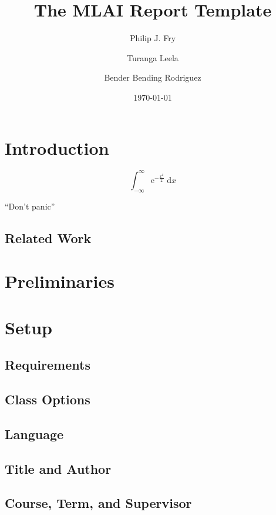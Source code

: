 \documentclass[logo]{mlai-report}
\title{The MLAI Report Template}
\author{Philip J. Fry \and Turanga Leela \and Bender Bending Rodriguez}
\date{\today}
\begin{document}
	\maketitle
	
	\begin{abstract}
		\blindtext 
	\end{abstract}
	

	\section{Introduction}
	
	\begin{equation}
	\int_{-\infty}^\infty \mathrm{e}^{-\frac{x^2}{2}} \; \mathrm{d}x 
	\end{equation}
	
	\enquote{Don't panic} \parencite{adams1979} \blindtext
	
	\subsection{Related Work}
	
	\section{Preliminaries} 

	\section{Setup} 
	
	\subsection{Requirements} 
	
	\subsection{Class Options} 
	
	\subsection{Language} 
	
	\subsection{Title and Author}
	
	\subsection{Course, Term, and Supervisor} 
	
\end{document}
